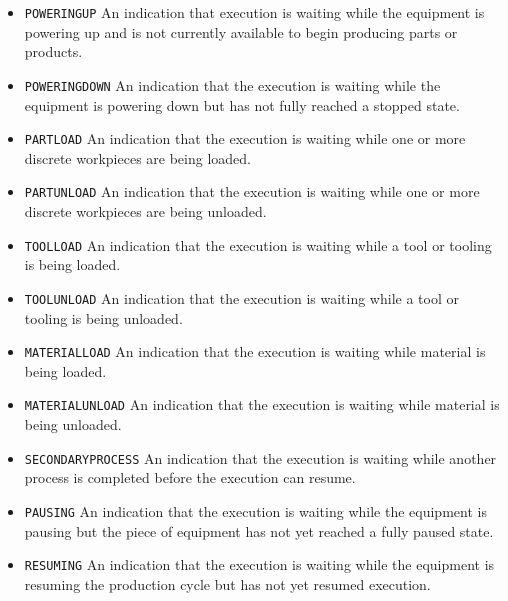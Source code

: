 \begin{itemize}
\item \texttt{POWERING\textunderscore UP} \newline An indication that execution is waiting while the equipment is powering up and is not currently available to begin producing parts or products. 
\item \texttt{POWERING\textunderscore DOWN} \newline An indication that the execution is waiting while the equipment is powering down but has not fully reached a stopped state. 
\item \texttt{PART\textunderscore LOAD} \newline An indication that the execution is waiting while one or more discrete workpieces are being loaded. 
\item \texttt{PART\textunderscore UNLOAD} \newline An indication that the execution is waiting while one or more discrete workpieces are being unloaded. 
\item \texttt{TOOL\textunderscore LOAD} \newline An indication that the execution is waiting while a tool or tooling is being loaded. 
\item \texttt{TOOL\textunderscore UNLOAD} \newline An indication that the execution is waiting while a tool or tooling is being unloaded. 
\item \texttt{MATERIAL\textunderscore LOAD} \newline An indication that the execution is waiting while material is being loaded. 
\item \texttt{MATERIAL\textunderscore UNLOAD} \newline An indication that the execution is waiting while material is being unloaded. 
\item \texttt{SECONDARY\textunderscore PROCESS} \newline An indication that the execution is waiting while another process is completed before the execution can resume. 
\item \texttt{PAUSING} \newline An indication that the execution is waiting while the equipment is pausing but the piece of equipment has not yet reached a fully paused state. 
\item \texttt{RESUMING} \newline An indication that the execution is waiting while the equipment is resuming the production cycle but has not yet resumed execution. 
\end{itemize}

